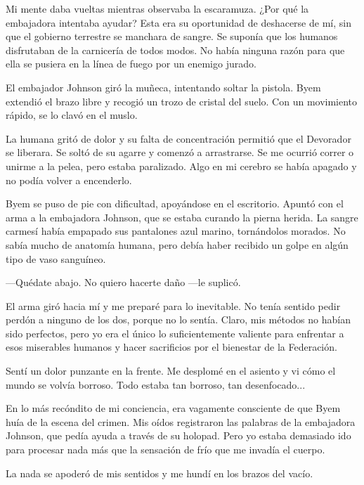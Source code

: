 Mi mente daba vueltas mientras observaba la escaramuza. ¿Por qué la embajadora intentaba ayudar? Esta era su oportunidad de deshacerse de mí, sin que el gobierno terrestre se manchara de sangre. Se suponía que los humanos disfrutaban de la carnicería de todos modos. No había ninguna razón para que ella se pusiera en la línea de fuego por un enemigo jurado.

El embajador Johnson giró la muñeca, intentando soltar la pistola. Byem extendió el brazo libre y recogió un trozo de cristal del suelo. Con un movimiento rápido, se lo clavó en el muslo.

La humana gritó de dolor y su falta de concentración permitió que el Devorador se liberara. Se soltó de su agarre y comenzó a arrastrarse. Se me ocurrió correr o unirme a la pelea, pero estaba paralizado. Algo en mi cerebro se había apagado y no podía volver a encenderlo.

Byem se puso de pie con dificultad, apoyándose en el escritorio. Apuntó con el arma a la embajadora Johnson, que se estaba curando la pierna herida. La sangre carmesí había empapado sus pantalones azul marino, tornándolos morados. No sabía mucho de anatomía humana, pero debía haber recibido un golpe en algún tipo de vaso sanguíneo.

—Quédate abajo. No quiero hacerte daño —le suplicó.

El arma giró hacia mí y me preparé para lo inevitable. No tenía sentido pedir perdón a ninguno de los dos, porque no lo sentía. Claro, mis métodos no habían sido perfectos, pero yo era el único lo suficientemente valiente para enfrentar a esos miserables humanos y hacer sacrificios por el bienestar de la Federación.

Sentí un dolor punzante en la frente. Me desplomé en el asiento y vi cómo el mundo se volvía borroso. Todo estaba tan borroso, tan desenfocado...

En lo más recóndito de mi conciencia, era vagamente consciente de que Byem huía de la escena del crimen. Mis oídos registraron las palabras de la embajadora Johnson, que pedía ayuda a través de su holopad. Pero yo estaba demasiado ido para procesar nada más que la sensación de frío que me invadía el cuerpo.

La nada se apoderó de mis sentidos y me hundí en los brazos del vacío.
